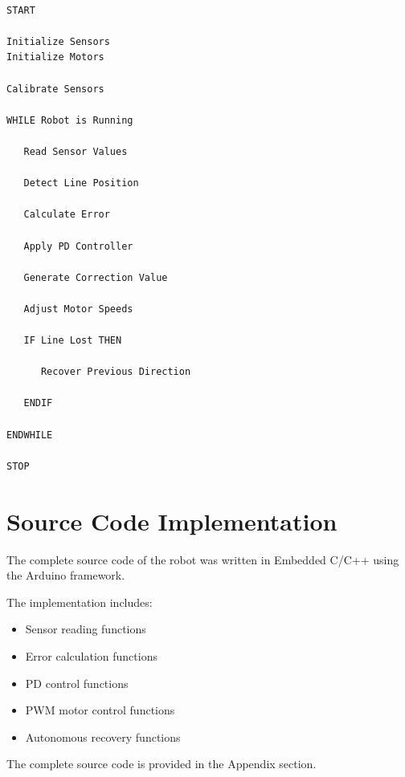 \documentclass[12pt,a4paper,oneside]{report}
\begin{document}
\begin{verbatim}

START

Initialize Sensors
Initialize Motors

Calibrate Sensors

WHILE Robot is Running

   Read Sensor Values

   Detect Line Position

   Calculate Error

   Apply PD Controller

   Generate Correction Value

   Adjust Motor Speeds

   IF Line Lost THEN

      Recover Previous Direction

   ENDIF

ENDWHILE

STOP

\end{verbatim}


\section{Source Code Implementation}

The complete source code of the robot was written in Embedded C/C++ using the Arduino framework.

The implementation includes:

\begin{itemize}

\item Sensor reading functions

\item Error calculation functions

\item PD control functions

\item PWM motor control functions

\item Autonomous recovery functions

\end{itemize}

The complete source code is provided in the Appendix section.
\end{document}
